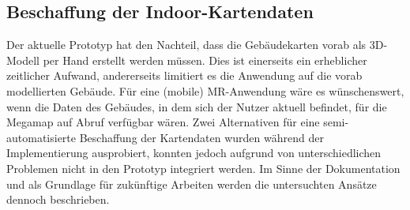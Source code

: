 \subsection*{Beschaffung der Indoor-Kartendaten}
Der aktuelle Prototyp hat den Nachteil, dass die Gebäudekarten vorab als 3D-Modell per Hand erstellt werden müssen.
Dies ist einerseits ein erheblicher zeitlicher Aufwand, andererseits limitiert es die Anwendung auf die vorab modellierten Gebäude.
Für eine (mobile) MR-Anwendung wäre es wünschenswert, wenn die Daten des Gebäudes, in dem sich der Nutzer aktuell befindet, für die Megamap auf Abruf verfügbar wären.
Zwei Alternativen für eine semi-automatisierte Beschaffung der Kartendaten wurden während der Implementierung ausprobiert, konnten jedoch aufgrund von unterschiedlichen Problemen nicht in den Prototyp integriert werden.
Im Sinne der Dokumentation und als Grundlage für zukünftige Arbeiten werden die untersuchten Ansätze dennoch beschrieben.

